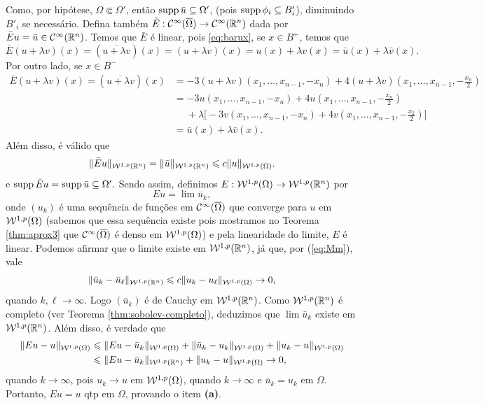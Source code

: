 \begin{prf}
    Como, por hipótese, $\Omega \Subset \Omega'$, então $\mathrm{supp}\, \bar u \subseteq \Omega'$, (pois $\mathrm{supp}\, \phi_i \subseteq B_i'$), diminuindo $B'_i$ se necessário.
    Defina também $\bar E: \mathcal{C}^\infty(\overline\Omega) \to \mathcal{C}^\infty(\mathbb{R}^n)$ dada por $\bar E u = \bar u \in \mathcal{C}^{\infty}(\mathbb{R}^n)$.
    Temos que $\bar E$ é linear, pois \ref{eq:barux}, se $x \in B^+$, temos que
    \[
        \bar E(u + \lambda v)(x) = (\overline{u + \lambda v})(x) = (u + \lambda v)(x) = u(x) + \lambda v(x) = \bar u(x) + \lambda \bar v(x).
    \]
    Por outro lado, se $x \in B^-$
    \[
        \begin{aligned}
            \bar E(u + \lambda v)(x) = (\overline{u + \lambda v})(x) &= -3(u + \lambda v)(x_1,\dots,x_{n-1},-x_n) + 4(u + \lambda v)(x_1,\dots,x_{n-1},-\tfrac{x_n}{2})\\
            &= -3 u(x_1,\dots,x_{n-1},-x_n) + 4 u(x_1,\dots,x_{n-1},-\tfrac{x_n}{2})\\ &\quad\;+ \lambda\big[-\!3 v(x_1,\dots,x_{n-1},-x_n) + 4v(x_1,\dots,x_{n-1},-\tfrac{x_2}{2}) \big]\\[5pt]
            &= \bar u(x) + \lambda \bar v(x).
        \end{aligned}
    \]
    Além disso, é válido que
    \[
        \Vert \bar E u \Vert_{\mathcal{W}^{1,p}(\mathbb{R}^n)} = \Vert \bar u \Vert_{\mathcal{W}^{1,p}(\mathbb{R}^n)} \leqslant c \Vert u \Vert_{\mathcal{W}^{1,p}(\Omega)}.
    \]
    e $\mathrm{supp}\, \bar E u  = \mathrm{supp}\, \bar u \subseteq \Omega'.$
    Sendo assim, definimos $E : \mathcal{W}^{1,p}(\Omega) \to \mathcal{W}^{1,p}(\mathbb{R}^n)$ por
    \[
        Eu = \lim \bar u_k,
    \]
    onde $(u_k)$ é uma sequência de funções em $\mathcal{C}^\infty(\overline\Omega)$ que converge para $u$ em $\mathcal{W}^{1,p}(\Omega)$ (sabemos que essa sequência existe pois mostramos no Teorema \ref{thm:aprox3} que $\mathcal{C}^\infty(\overline\Omega)$ é denso em $\mathcal{W}^{1,p}(\Omega)$) e pela linearidade do limite, $E$ é linear.
    Podemos afirmar que o limite existe em $\mathcal{W}^{1,p}(\mathbb{R}^n)$, já que, por (\ref{eq:Mm}), vale
    \[
        \Vert \bar u_k - \bar u_\ell \Vert_{\mathcal{W}^{1,p}(\mathbb{R}^n)} \leqslant c \Vert u_k - u_\ell \Vert_{\mathcal{W}^{1,p}(\Omega)} \to 0,
    \]
    quando $k,\ell \to \infty$.
    Logo $(\bar u_k)$ é de Cauchy em $\mathcal{W}^{1,p}(\mathbb{R}^n)$.
    Como $\mathcal{W}^{1,p}(\mathbb{R}^n)$ é completo (ver Teorema \ref{thm:sobolev-completo}), deduzimos que $\lim \bar u_k$ existe em $\mathcal{W}^{1,p}(\mathbb{R}^n)$.
    Além disso, é verdade que
    \[
        \begin{aligned}
            \Vert Eu - u \Vert_{\mathcal{W}^{1,p}(\Omega)} &\leqslant \Vert Eu - \bar u_k \Vert_{\mathcal{W}^{1,p}(\Omega)} + \Vert \bar u_k - u_k \Vert_{\mathcal{W}^{1,p}(\Omega)} + \Vert u_k - u\Vert_{\mathcal{W}^{1,p}(\Omega)}\\
            &\leqslant \Vert Eu - \bar u_k \Vert_{\mathcal{W}^{1,p}(\mathbb{R}^n)} + \Vert u_k - u \Vert_{\mathcal{W}^{1,p}(\Omega)} \to 0,
        \end{aligned}
    \]
    quando $k \to \infty$,
    pois $u_k \to u$ em $\mathcal{W}^{1,p}(\Omega)$, quando $k \to \infty$ e $\bar u_k = u_k$ em $\Omega$.
    Portanto, $Eu = u$ qtp em $\Omega$, provando o item \textbf{(a)}.


\end{prf}
